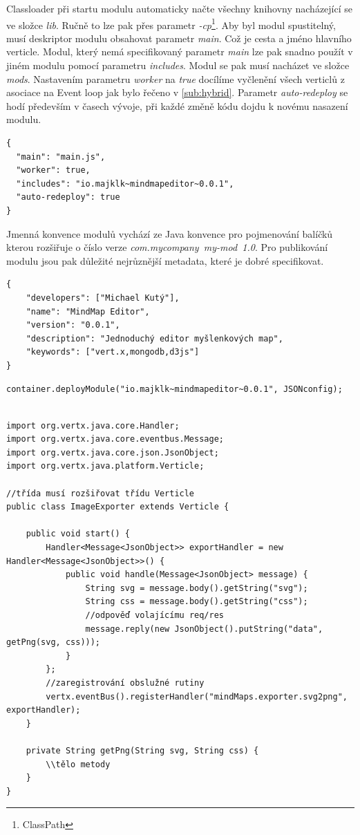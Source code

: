Classloader při startu modulu automaticky načte všechny knihovny nacházející se ve složce \emph{lib}. Ručně to lze pak přes parametr \emph{-cp}\footnote{ClassPath}. Aby byl modul spustitelný, musí deskriptor modulu obsahovat parametr \emph{main}. Což je cesta a jméno hlavního verticle. Modul, který nemá specifikovaný parametr \emph{main} lze pak snadno použít v jiném modulu pomocí parametru \emph{includes}. Modul se pak musí nacházet ve složce \emph{mods}. Nastavením parametru \emph{worker} na \emph{true} docílíme vyčlenění všech verticlů z asociace na Event loop jak bylo řečeno v \ref{sub:hybrid}. Parametr \emph{auto-redeploy} se hodí především v časech vývoje, při každé změně kódu dojdu k novému nasazení modulu. 
\begin{lstlisting}
{
  "main": "main.js",
  "worker": true,
  "includes": "io.majklk~mindmapeditor~0.0.1",
  "auto-redeploy": true
}
\end{lstlisting}

Jmenná konvence modulů vychází ze Java konvence \cite{javaPKG} pro pojmenování balíčků kterou rozšiřuje o číslo verze \emph{com.mycompany~my-mod~1.0}.
Pro publikování modulu jsou pak důležité nejrůznější metadata, které je dobré specifikovat.
\begin{lstlisting}[caption=Deskriptor modulu]
{
	"developers": ["Michael Kutý"],
	"name": "MindMap Editor",
	"version": "0.0.1",
	"description": "Jednoduchý editor myšlenkových map",
	"keywords": ["vert.x,mongodb,d3js"]
}  
\end{lstlisting}

\begin{lstlisting}[caption=Spuštění modulu v jazyce Java]
container.deployModule("io.majklk~mindmapeditor~0.0.1", JSONconfig);
\end{lstlisting}

\begin{lstlisting}[caption=Verticle v jazyce Java]

import org.vertx.java.core.Handler;
import org.vertx.java.core.eventbus.Message;
import org.vertx.java.core.json.JsonObject;
import org.vertx.java.platform.Verticle;

//třída musí rozšiřovat třídu Verticle
public class ImageExporter extends Verticle {
	
	public void start() {
		Handler<Message<JsonObject>> exportHandler = new Handler<Message<JsonObject>>() {
			public void handle(Message<JsonObject> message) {
				String svg = message.body().getString("svg");
				String css = message.body().getString("css");
				//odpověď volajícímu req/res
				message.reply(new JsonObject().putString("data", getPng(svg, css)));
			}
		};
		//zaregistrování obslužné rutiny
		vertx.eventBus().registerHandler("mindMaps.exporter.svg2png", exportHandler);
	}

	private String getPng(String svg, String css) { 
		\\tělo metody
	}
}
\end{lstlisting}

